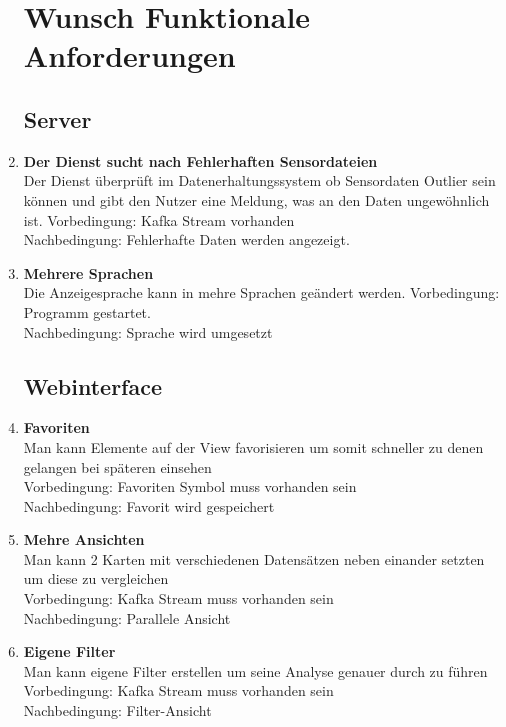 \begin{enumerate}[label=\textbf{WF\arabic{enumi}0}]
	\setcounter{enumi}{99}
	\section{Wunsch Funktionale Anforderungen}
	
	\subsection{Server}
	

	
	\item \textbf{Der Dienst sucht nach Fehlerhaften Sensordateien}\\
	Der Dienst überprüft im Datenerhaltungssystem ob Sensordaten Outlier sein können und gibt den Nutzer eine Meldung, was an den Daten ungewöhnlich ist.
	Vorbedingung: Kafka Stream vorhanden \\
	Nachbedingung: Fehlerhafte Daten werden angezeigt.\\ 
	 
	\item \textbf{Mehrere Sprachen}\\
	Die Anzeigesprache kann in mehre Sprachen geändert werden.
	Vorbedingung: Programm gestartet. \\
	Nachbedingung: Sprache wird umgesetzt\\ 
	
	
	
		
	\subsection{Webinterface}
	\item \textbf{Favoriten}\\
		Man kann Elemente auf der View favorisieren um somit schneller zu denen gelangen bei späteren einsehen \\
		Vorbedingung: Favoriten Symbol muss vorhanden sein \\
		Nachbedingung: Favorit wird gespeichert\\ 
	
	\item \textbf{Mehre Ansichten}\\
		Man kann 2 Karten mit verschiedenen Datensätzen neben einander setzten um diese zu vergleichen \\
		Vorbedingung: Kafka Stream muss vorhanden sein\\
		Nachbedingung: Parallele Ansicht\\ 
	
	\item \textbf{Eigene Filter}\\
		Man kann eigene Filter erstellen um seine Analyse genauer durch zu führen\\
		Vorbedingung: Kafka Stream muss vorhanden sein\\
		Nachbedingung: Filter-Ansicht\\ 

\end{enumerate}
	
	 
	  
